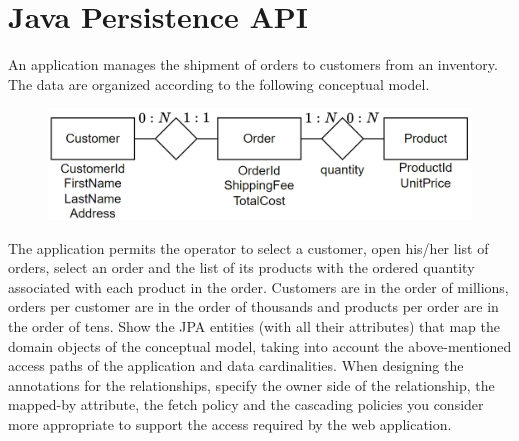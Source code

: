 \section{Java Persistence API}

An application manages the shipment of orders to customers from an inventory. 
The data are organized according to the following conceptual model. 
\begin{figure}[H]
    \centering
    \includegraphics[width=0.6\linewidth]{images/jpa.png}
\end{figure}
The application permits the operator to select a customer, open his/her list of orders, select an order and the list of its products with the ordered quantity associated with each product in the order. 
Customers are in the order of millions, orders per customer are in the order of thousands and products per order are in the order of tens.
Show the JPA entities (with all their attributes) that map the domain objects of the conceptual model, taking into account the above-mentioned access paths of the application and data cardinalities.
When designing the annotations for the relationships, specify the owner side of the relationship, the mapped-by attribute, the fetch policy and the cascading policies you consider more appropriate to support the access required by the web application. 

